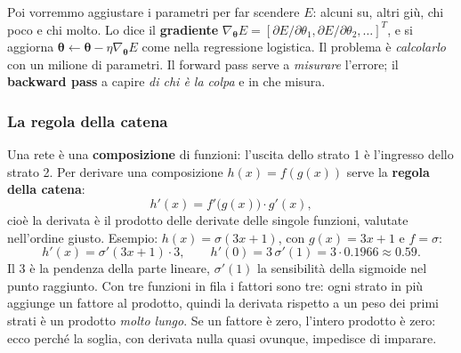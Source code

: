 \documentclass[12pt]{extarticle}
\begin{document}
\begin{center}
\end{center}

\noindent Poi vorremmo aggiustare i parametri per far scendere $E$: alcuni su, altri giù, chi poco e chi molto. Lo dice il \textbf{gradiente} $\nabla_{\boldsymbol{\theta}}E=[\partial E/\partial\theta_1,\partial E/\partial\theta_2,\dots]^T$, e si aggiorna $\boldsymbol{\theta}\leftarrow\boldsymbol{\theta}-\eta\nabla_{\boldsymbol{\theta}}E$ come nella regressione logistica. Il problema è \emph{calcolarlo} con un milione di parametri. Il forward pass serve a \emph{misurare} l'errore; il \textbf{backward pass} a capire \emph{di chi è la colpa} e in che misura.

\subsubsection{La regola della catena}

\noindent Una rete è una \textbf{composizione} di funzioni: l'uscita dello strato 1 è l'ingresso dello strato 2. Per derivare una composizione $h(x)=f(g(x))$ serve la \textbf{regola della catena}:
\[
h'(x)=f'\big(g(x)\big)\cdot g'(x),
\]
cioè la derivata è il prodotto delle derivate delle singole funzioni, valutate nell'ordine giusto. Esempio: $h(x)=\sigma(3x+1)$, con $g(x)=3x+1$ e $f=\sigma$:
\[
h'(x)=\sigma'(3x+1)\cdot3,
\qquad
h'(0)=3\,\sigma'(1)=3\cdot0.1966\approx0.59 .
\]
Il 3 è la pendenza della parte lineare, $\sigma'(1)$ la sensibilità della sigmoide nel punto raggiunto. Con tre funzioni in fila i fattori sono tre: ogni strato in più aggiunge un fattore al prodotto, quindi la derivata rispetto a un peso dei primi strati è un prodotto \emph{molto lungo}. Se un fattore è zero, l'intero prodotto è zero: ecco perché la soglia, con derivata nulla quasi ovunque, impedisce di imparare.
\end{document}
